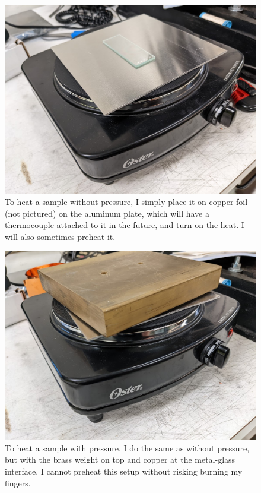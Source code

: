 \documentclass[colorlinks=true,pdfstartview=FitV,linkcolor=blue,
            citecolor=red,urlcolor=magenta]{ligodoc}
\begin{document}
\begin{figure}[htbp]
\begin{center}
\includegraphics[width=6in]{graphics/heat_without_pressure_PXL_20220712_232551854.jpg}
\caption{To heat a sample without pressure, I simply place it on copper foil (not pictured) on the aluminum plate, which will have a thermocouple attached to it in the future, and turn on the heat. I will also sometimes preheat it.}
\label{fig:heat_without_pressure}
\end{center}
\end{figure}

\begin{figure}[htbp]
\begin{center}
\includegraphics[width=6in]{graphics/heat_with_pressure_PXL_20220713_003923957.jpg}
\caption{To heat a sample with pressure, I do the same as without pressure, but with the brass weight on top and copper at the metal-glass interface. I cannot preheat this setup without risking burning my fingers.}
\label{fig:heat_with_pressure}
\end{center}
\end{figure}
\end{document}
